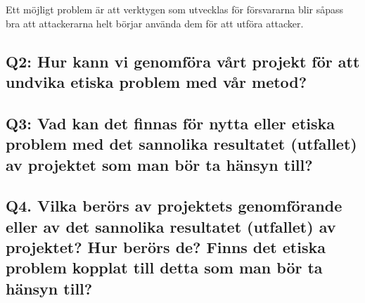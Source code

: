 Ett möjligt problem är att verktygen som utvecklas för försvararna blir såpass bra att attackerarna helt börjar använda dem för att utföra attacker.

\subsection{Q2: Hur kann vi genomföra vårt projekt för att undvika etiska problem med vår metod?}


\subsection{Q3: Vad kan det finnas för nytta eller etiska problem med det sannolika resultatet (utfallet) av projektet som man bör ta hänsyn till?}


\subsection{Q4. Vilka berörs av projektets genomförande eller av det sannolika resultatet (utfallet) av projektet? Hur berörs de? Finns det etiska problem kopplat till detta som man bör ta hänsyn till?}


